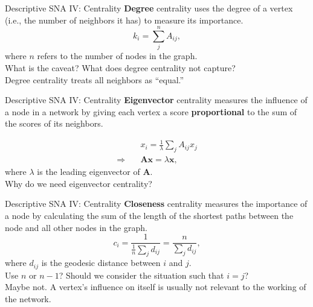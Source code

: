\documentclass[10pt]{beamer}
\begin{document}
\begin{frame}{Descriptive SNA IV: Centrality}
\textbf{Degree} centrality uses the degree of a vertex (i.e., the number of neighbors it has) to measure its importance.
	\begin{equation}
	k_i = \sum_j^n A_{ij},
	\end{equation}
where $n$ refers to the number of nodes in the graph.\\

\vspace{0.3cm}
What is the caveat? What does degree centrality not capture?\\

\vspace{0.2cm}
Degree centrality treats all neighbors as ``equal.''
\end{frame}

\begin{frame}{Descriptive SNA IV: Centrality}
\textbf{Eigenvector} centrality measures the influence of a node in a network by giving each vertex a score \textbf{proportional} to the sum of the scores of its neighbors.

	\begin{equation}
	\begin{split}
	& x_i = \frac{1}{\lambda}\sum_j A_{ij}x_j \\
	\Rightarrow \quad & \textbf{Ax} = \lambda\textbf{x},
	\end{split}
	\end{equation}
where $\lambda$ is the leading eigenvector of \textbf{A}.\\

\vspace{0.3cm}
Why do we need eigenvector centrality?
\end{frame}

\begin{frame}{Descriptive SNA IV: Centrality}
\textbf{Closeness} centrality measures the importance of a node by calculating the sum of the length of the shortest paths between the node and all other nodes in the graph.
	\begin{equation}
	c_i = \frac{1}{\frac{1}{n} \sum_j d_{ij}} = \frac{n}{\sum_j d_{ij}},
	\end{equation}
where $d_{ij}$ is the geodesic distance between $i$ and $j$.\\

\vspace{0.3cm}
Use $n$ or $n-1$?  Should we consider the situation such that $i=j$?\\

\vspace{0.2cm}
Maybe not. A vertex's influence on itself is usually not relevant to the working of the network.
\end{frame}
\end{document}
